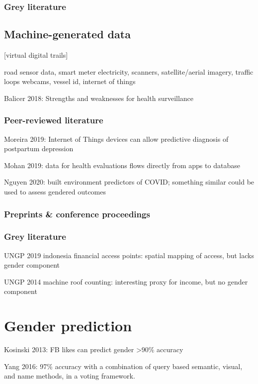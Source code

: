 \documentclass{article}
\begin{document}
\subsubsection{Grey literature}



\subsection{Machine-generated data}

[virtual digital trails]

road sensor data, smart meter electricity, scanners, satellite/aerial imagery, traffic loops webcams, vessel id, internet of things

Balicer 2018: Strengths and weaknesses for health surveillance


\subsubsection{Peer-reviewed literature}

Moreira 2019: Internet of Things devices can allow predictive diagnosis of postpartum depression 

Mohan 2019: data for health evaluations flows directly from apps to database

Nguyen 2020: built environment predictors of COVID; something similar could be used to assess gendered outcomes


\subsubsection{Preprints \& conference proceedings}

\subsubsection{Grey literature}

UNGP 2019 indonesia financial access points: spatial mapping of access, but lacks gender component

UNGP 2014 machine roof counting: interesting proxy for income, but no gender component

\section{Gender prediction}

Kosinski 2013: FB likes can predict gender >90\% accuracy

Yang 2016: 97\% accuracy with a combination of query based semantic, visual, and name methods, in a voting framework.
\end{document}
